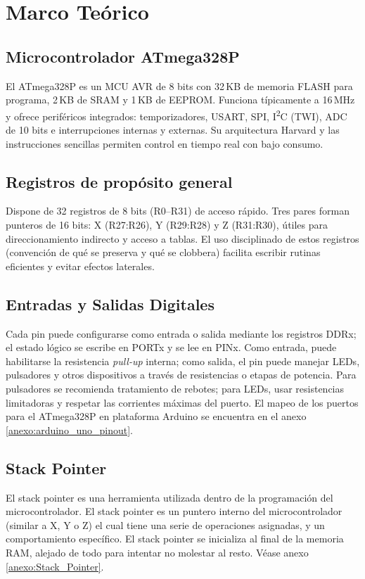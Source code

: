 \section{Marco Teórico}

\subsection{Microcontrolador ATmega328P}
El ATmega328P es un MCU AVR de 8 bits con 32\,KB de memoria FLASH para programa, 2\,KB de SRAM y 1\,KB de EEPROM. Funciona típicamente a 16\,MHz y ofrece periféricos integrados: temporizadores, USART, SPI, I\textsuperscript{2}C (TWI), ADC de 10 bits e interrupciones internas y externas. Su arquitectura Harvard y las instrucciones sencillas permiten control en tiempo real con bajo consumo. 

\subsection{Registros de propósito general}
Dispone de 32 registros de 8 bits (R0–R31) de acceso rápido. Tres pares forman punteros de 16 bits: X (R27:R26), Y (R29:R28) y Z (R31:R30), útiles para direccionamiento indirecto y acceso a tablas. El uso disciplinado de estos registros (convención de qué se preserva y qué se clobbera) facilita escribir rutinas eficientes y evitar efectos laterales.

\subsection{Entradas y Salidas Digitales}
Cada pin puede configurarse como entrada o salida mediante los registros DDRx; el estado lógico se escribe en PORTx y se lee en PINx. Como entrada, puede habilitarse la resistencia \textit{pull-up} interna; como salida, el pin puede manejar LEDs, pulsadores y otros dispositivos a través de resistencias o etapas de potencia. Para pulsadores se recomienda tratamiento de rebotes; para LEDs, usar resistencias limitadoras y respetar las corrientes máximas del puerto. El mapeo de los puertos para el ATmega328P en plataforma Arduino se encuentra en el anexo \ref{anexo:arduino_uno_pinout}.


\subsection{Stack Pointer}
El stack pointer es una herramienta utilizada dentro de la programación del microcontrolador. El stack pointer es un puntero interno del microcontrolador (similar a X, Y o Z) el cual tiene una serie de operaciones asignadas, y un comportamiento específico. El stack pointer se inicializa al final de la memoria RAM, alejado de todo para intentar no molestar al resto. Véase anexo \ref{anexo:Stack_Pointer}.

